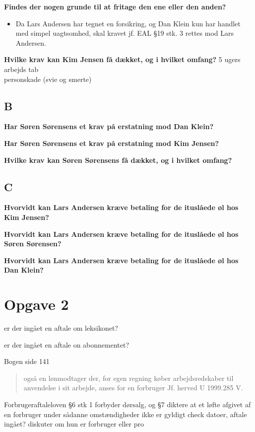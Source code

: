 \documentclass[11pt, a4paper]{article}
\begin{document}
\textbf{Findes der nogen grunde til at fritage den ene eller den anden?}
\begin{itemize}
  \item Da Lars Andersen har tegnet en forsikring, og Dan Klein kun har handlet med
		simpel uagtsomhed, skal kravet jf. EAL §19 stk. 3 rettes mod Lars Andersen.
\end{itemize}

\textbf{Hvilke krav kan Kim Jensen få dækket, og i hvilket omfang?}
5 ugers arbejds tab\\
personskade (svie og smerte)

\subsection*{B}
\textbf{Har Søren Sørensens et krav på erstatning mod Dan Klein?}

\textbf{Har Søren Sørensens et krav på erstatning mod Kim Jensen?}

\textbf{Hvilke krav kan Søren Sørensens få dækket, og i hvilket omfang?}

\subsection*{C}
\textbf{Hvorvidt kan Lars Andersen kræve betaling for de ituslåede øl hos Kim Jensen?}

\textbf{Hvorvidt kan Lars Andersen kræve betaling for de ituslåede øl hos Søren
Sørensen?}

\textbf{Hvorvidt kan Lars Andersen kræve betaling for de ituslåede øl hos Dan Klein?}


\section{Opgave 2}
er der ingået en aftale om leksikonet?

er der ingået en aftale on abonnementet?

Bogen side 141 \begin{quote}
også en lønmodtager der, for egen regning køber
arbejdsredskaber til anvendelse i sit arbejde, anses for en forbruger Jf.
herved U 1999.285 V.
\end{quote}


Forbrugeraftaleloven §6 stk 1 forbyder dørsalg, og §7 diktere at et løfte
afgivet af en forbruger under sådanne omstændigheder ikke er gyldigt
check
datoer, aftale ingået? diskuter om hun er forbruger eller pro
\end{document}
